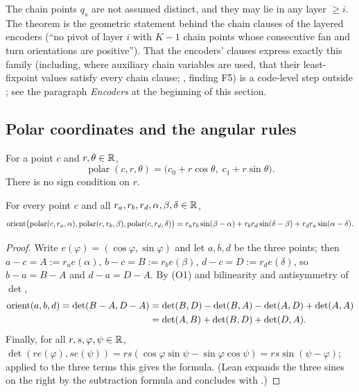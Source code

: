 \begin{remark}
The chain points $q_s$ are not assumed distinct, and they may lie in any layer $\ge i$. The theorem is the geometric
statement behind the chain clauses of the layered encoders (``no pivot of layer $i$ with $K-1$ chain points whose
consecutive fan and turn orientations are positive''). That the encoders' clauses express exactly this family
(including, where auxiliary chain variables are used, that their least-fixpoint values satisfy every chain clause;
, finding F5) is a code-level step outside ; see the
paragraph \emph{Encoders} at the beginning of this section.
\end{remark}

\subsection{Polar coordinates and the angular rules}\label{lg:ssec:polar}

\begin{definition}\label{lg:def:polar}
For a point $c$ and $r,\theta\in\mathbb R$,
\[
  \operatorname{polar}(c,r,\theta)=\bigl(c_0+r\cos\theta,\;c_1+r\sin\theta\bigr).
\]
There is no sign condition on $r$.
\end{definition}

\begin{lemma}\label{lg:lem:polar}
For every point $c$ and all $r_a,r_b,r_d,\alpha,\beta,\delta\in\mathbb R$,
\[
  \operatorname{orient}\bigl(\operatorname{polar}(c,r_a,\alpha),\operatorname{polar}(c,r_b,\beta),\operatorname{polar}(c,r_d,\delta)\bigr)
  =r_ar_b\sin(\beta-\alpha)+r_br_d\sin(\delta-\beta)+r_dr_a\sin(\alpha-\delta).
\]
\end{lemma}

\begin{proof}
Write $e(\varphi)=(\cos\varphi,\sin\varphi)$ and let $a,b,d$ be the three points; then $a-c=A:=r_ae(\alpha)$,
$b-c=B:=r_be(\beta)$, $d-c=D:=r_de(\delta)$, so $b-a=B-A$ and $d-a=D-A$. By (O1) and bilinearity and antisymmetry of
$\det$,
\begin{align*}
  \operatorname{orient}(a,b,d)=\det(B-A,D-A)&=\det(B,D)-\det(B,A)-\det(A,D)+\det(A,A)\\
  &=\det(A,B)+\det(B,D)+\det(D,A).
\end{align*}
Finally, for all $r,s,\varphi,\psi\in\mathbb R$,
$\det(re(\varphi),se(\psi))=rs(\cos\varphi\sin\psi-\sin\varphi\cos\psi)=rs\sin(\psi-\varphi)$; applied to the three
terms this gives the formula. (Lean expands the three sines on the right by the subtraction formula and concludes with
.)
\end{proof}

